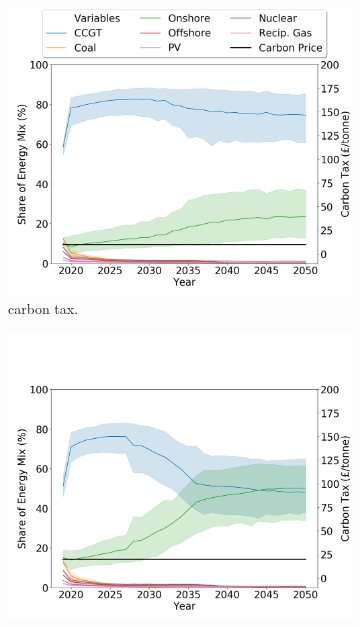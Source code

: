 \begin{figure}[h]
	\centering
	\begin{subfigure}[b]{0.33\textwidth}
		\centering
		\includegraphics[width=\textwidth]{figures/scenarios/demand099-carbon10-datetime.png}
		\caption[Network2]%
		{\small {} carbon tax.}
		\label{fig:demand99carbon10}
	\end{subfigure}
	\hfill
	\begin{subfigure}[b]{0.33\textwidth}  
		\centering 
		\includegraphics[width=\textwidth]{figures/scenarios/demand099-carbon20-datetime.png}

\end{subfigure}
\end{figure}
